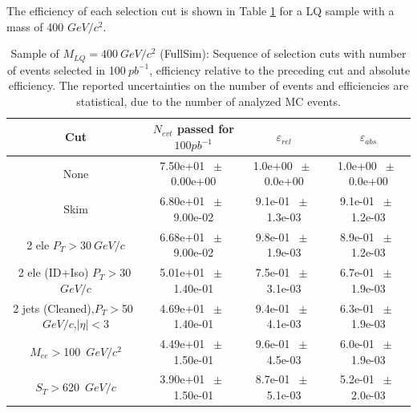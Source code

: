 \documentclass{cmspaper}
\begin{document}
\begin{linenumbers}
The efficiency of each selection cut is shown in Table \ref{tab:effic-MLQ400} 
for a LQ sample with a mass of 400 $GeV/c^2$. 


\begin{table}[htbp] 
\begin{center} 
\begin{tabular}{|c|c|c|c|} 
\hline\hline 
 Cut & $N_{evt}$ passed for $100pb^{-1}$ & $\varepsilon_{rel}$ & $\varepsilon_{abs}$ \\ 
\hline\hline 
None       &        7.50e+01       $~\pm~$       0.00e+00        &        1.0e+00       $~\pm~$       0.0e+00        &        1.0e+00       $~\pm~$       0.0e+00       \\       
       Skim       &        6.80e+01       $~\pm~$       9.00e-02        &        9.1e-01       $~\pm~$       1.3e-03        &        9.1e-01       $~\pm~$       1.2e-03       \\       
       2 ele $P_T>30~$$GeV/c$       &        6.68e+01       $~\pm~$       9.00e-02        &        9.8e-01       $~\pm~$       1.9e-03        &        8.9e-01       $~\pm~$       1.2e-03       \\       
       2 ele (ID+Iso) $P_T>30~$$GeV/c$       &        5.01e+01       $~\pm~$       1.40e-01        &        7.5e-01       $~\pm~$       3.1e-03        &        6.7e-01       $~\pm~$       1.9e-03       \\       
       2 jets (Cleaned),$P_T>$50~$GeV/c$,$|\eta|<$3       &        4.69e+01       $~\pm~$       1.40e-01        &        9.4e-01       $~\pm~$       4.1e-03        &        6.3e-01       $~\pm~$       1.9e-03       \\       
       $M_{ee}>$100~$GeV/c^2$       &        4.49e+01       $~\pm~$       1.50e-01        &        9.6e-01       $~\pm~$       4.5e-03        &        6.0e-01       $~\pm~$       1.9e-03       \\       
       $S_T>$620~$GeV/c$       &        3.90e+01       $~\pm~$       1.50e-01        &        8.7e-01       $~\pm~$       5.1e-03        &        5.2e-01       $~\pm~$       2.0e-03       \\       
          \hline\hline 
\end{tabular} 
\end{center} 
\caption{Sample of $M_{LQ}=400~$$GeV/c^2$ (FullSim): Sequence of selection cuts with number of events selected in 100$~pb^{-1}$, efficiency relative to the preceding cut and absolute efficiency. The reported uncertainties on the number of events and efficiencies are statistical, due to the number of analyzed MC events.} 
\label{tab:effic-MLQ400} 
\end{table} 




\end{linenumbers}
\end{document}
